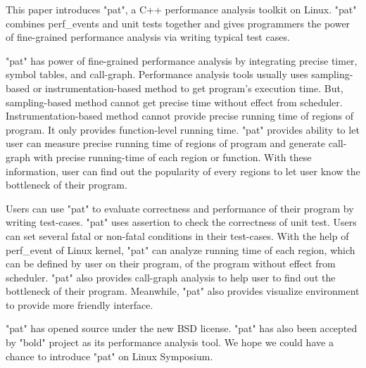 This paper introduces "pat", a C++ performance analysis toolkit on Linux.
"pat" combines perf_events and unit tests together and gives programmers the power of fine-grained performance analysis via writing typical test cases.

"pat" has power of fine-grained performance analysis by integrating precise timer, symbol tables, and call-graph.
Performance analysis tools usually uses sampling-based or instrumentation-based method to get program's execution time.
But, sampling-based method cannot get precise time without effect from scheduler.
Instrumentation-based method cannot provide precise running time of regions of program.
It only provides function-level running time. 
"pat" provides ability to let user can measure precise running time of regions of program and generate call-graph with precise running-time of each region or function. 
With these information, user can find out the popularity of every regions to let user know the bottleneck of their program.

Users can use "pat" to evaluate correctness and performance of their program by writing test-cases.
"pat" uses assertion to check the correctness of unit test. 
Users can set several fatal or non-fatal conditions in their test-cases.
With the help of perf_event of Linux kernel, "pat" can analyze running time of each region, which can be defined by user on their program, of the program without effect from scheduler. 
"pat" also provides call-graph analysis to help user to find out the bottleneck of their program. 
Meanwhile, "pat" also provides visualize environment to provide more friendly interface.

"pat" has opened source under the new BSD license. 
"pat" has also been accepted by "bold" project as its performance analysis tool.
We hope we could have a chance to introduce "pat" on Linux Symposium.
